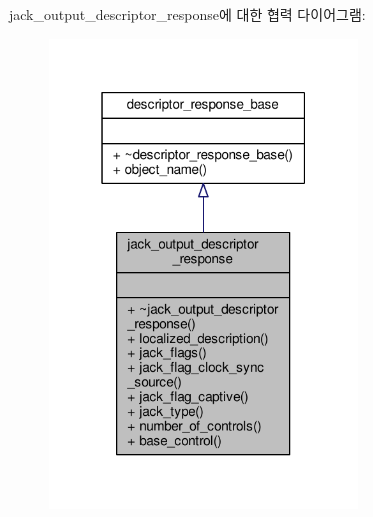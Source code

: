 jack\+\_\+output\+\_\+descriptor\+\_\+response에 대한 협력 다이어그램\+:
\nopagebreak
\begin{figure}[H]
\begin{center}
\leavevmode
\includegraphics[width=232pt]{classavdecc__lib_1_1jack__output__descriptor__response__coll__graph}
\end{center}
\end{figure}
